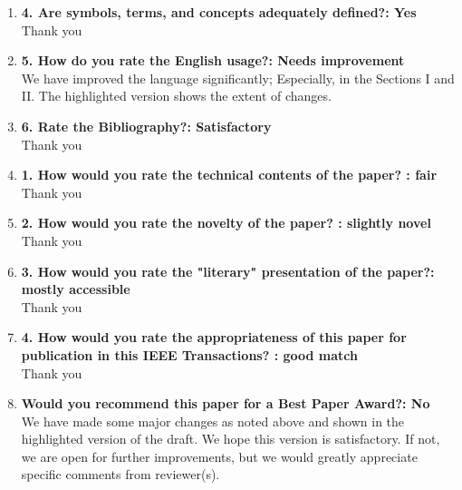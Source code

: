 \documentclass[11pt]{article}
\begin{document}
\begin{enumerate}
\item\textbf{4. Are symbols, terms, and concepts adequately defined?: Yes
}\\
Thank you

\item\textbf{5. How do you rate the English usage?: Needs improvement}\\
We have improved the language significantly; Especially, in the Sections I and II. The highlighted version shows the extent of changes.

\item\textbf{6. Rate the Bibliography?: Satisfactory
}\\
Thank you
\item\textbf{1. How would you rate the technical contents of the paper? : fair}\\
Thank you
\item\textbf{2. How would you rate the novelty of the paper? : slightly novel}\\
Thank you

\item\textbf{3. How would you rate the "literary" presentation of the paper?: mostly accessible
}\\
Thank you
\item\textbf{4. How would you rate the appropriateness of this paper for publication in this IEEE Transactions? : good match}\\
Thank you

\item\textbf{Would you recommend this paper for a Best Paper Award?: No
}\\
We have made some major changes as noted above and shown in the highlighted version of the draft. We hope this version is satisfactory. If not, we are open for further improvements, but we would greatly appreciate specific comments from reviewer(s).

\end{enumerate}
\end{document}
